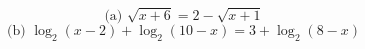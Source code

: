 \documentclass{article}
\begin{document}
\[ \text{(a) } \sqrt{x+6} = 2 - \sqrt{x+1} \]
\[ \text{(b) } \log_2(x-2) + \log_2(10-x) = 3 + \log_2(8-x) \]
\end{document}
